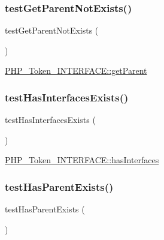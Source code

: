 \subsubsection{\texorpdfstring{test\+Get\+Parent\+Not\+Exists()}{testGetParentNotExists()}}
{\footnotesize\ttfamily test\+Get\+Parent\+Not\+Exists (\begin{DoxyParamCaption}{ }\end{DoxyParamCaption})}

\mbox{\hyperlink{class_p_h_p___token___i_n_t_e_r_f_a_c_e_a95ecaee3537b1ad29b04ef383a57bbae}{P\+H\+P\+\_\+\+Token\+\_\+\+I\+N\+T\+E\+R\+F\+A\+C\+E\+::get\+Parent}} \mbox{\label{class_p_h_p___token___interface_test_a72a50a9435982bda113e188e20354a48}} 
\subsubsection{\texorpdfstring{test\+Has\+Interfaces\+Exists()}{testHasInterfacesExists()}}
{\footnotesize\ttfamily test\+Has\+Interfaces\+Exists (\begin{DoxyParamCaption}{ }\end{DoxyParamCaption})}

\mbox{\hyperlink{class_p_h_p___token___i_n_t_e_r_f_a_c_e_ad8a516c9d1294cf166daa14598b1f299}{P\+H\+P\+\_\+\+Token\+\_\+\+I\+N\+T\+E\+R\+F\+A\+C\+E\+::has\+Interfaces}} \mbox{\label{class_p_h_p___token___interface_test_a33d0c29491b97fea29b7bf746b39795b}} 
\subsubsection{\texorpdfstring{test\+Has\+Parent\+Exists()}{testHasParentExists()}}
{\footnotesize\ttfamily test\+Has\+Parent\+Exists (\begin{DoxyParamCaption}{ }\end{DoxyParamCaption})}

